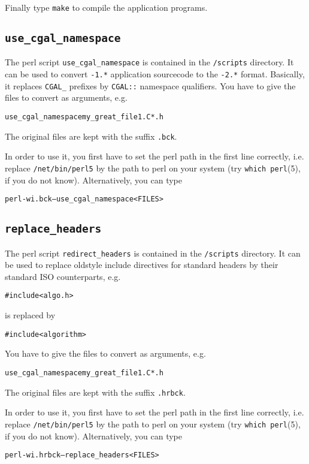 Finally type \texttt{make} to compile the application programs.

\subsection{\texttt{use\_cgal\_namespace}}\label{sec:use_cgal_namespace}

The perl script \texttt{use\_cgal\_namespace} is contained in the
\cgaldir\texttt{/scripts} directory. It can be used to convert
\cgal\texttt{-1.*} application sourcecode to the \cgal\texttt{-2.*}
format.  Basically, it replaces \texttt{CGAL\_} prefixes by
\texttt{CGAL::} namespace qualifiers. You have to give the files to
convert as arguments, e.g.
\begin{alltt}
  use_cgal_namespace my_great_file1.C *.h
\end{alltt}
The original files are kept with the suffix \texttt{.bck}.

In order to use it, you first have to set the perl path in the first
line correctly, i.e. replace \texttt{/net/bin/perl5} by the path to
perl on your system (try \texttt{which perl}(5), if you do not know).
Alternatively, you can type
\begin{alltt}
  perl -wi.bck -- use_cgal_namespace <FILES>
\end{alltt}

\subsection{\texttt{replace\_headers}}\label{sec:replace_headers}

The perl script \texttt{redirect\_headers} is contained in the
\cgaldir\texttt{/scripts} directory. It can be used to replace
oldstyle include directives for standard headers by their standard ISO
counterparts, e.g.
\begin{alltt}
  #include <algo.h>
\end{alltt}
is replaced by
\begin{alltt}
  #include <algorithm>
\end{alltt}
You have to give the files to
convert as arguments, e.g.
\begin{alltt}
  use_cgal_namespace my_great_file1.C *.h
\end{alltt}
The original files are kept with the suffix \texttt{.hrbck}.

In order to use it, you first have to set the perl path in the first
line correctly, i.e. replace \texttt{/net/bin/perl5} by the path to
perl on your system (try \texttt{which perl}(5), if you do not know).
Alternatively, you can type
\begin{alltt}
  perl -wi.hrbck -- replace_headers <FILES>
\end{alltt}

\lcTex{\end{appendix}}



